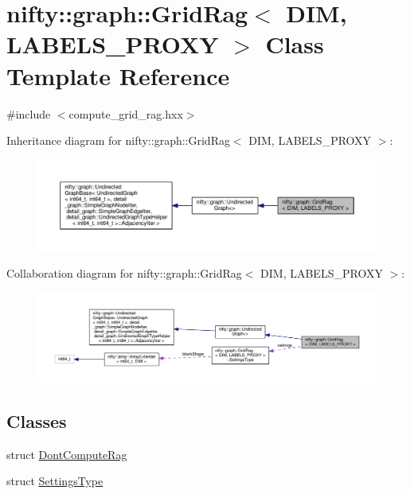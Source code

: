 \hypertarget{classnifty_1_1graph_1_1GridRag}{}\section{nifty\+:\+:graph\+:\+:Grid\+Rag$<$ D\+I\+M, L\+A\+B\+E\+L\+S\+\_\+\+P\+R\+O\+X\+Y $>$ Class Template Reference}
\label{classnifty_1_1graph_1_1GridRag}


{\ttfamily \#include $<$compute\+\_\+grid\+\_\+rag.\+hxx$>$}



Inheritance diagram for nifty\+:\+:graph\+:\+:Grid\+Rag$<$ D\+I\+M, L\+A\+B\+E\+L\+S\+\_\+\+P\+R\+O\+X\+Y $>$\+:\nopagebreak
\begin{figure}[H]
\begin{center}
\leavevmode
\includegraphics[width=350pt]{classnifty_1_1graph_1_1GridRag__inherit__graph}
\end{center}
\end{figure}


Collaboration diagram for nifty\+:\+:graph\+:\+:Grid\+Rag$<$ D\+I\+M, L\+A\+B\+E\+L\+S\+\_\+\+P\+R\+O\+X\+Y $>$\+:\nopagebreak
\begin{figure}[H]
\begin{center}
\leavevmode
\includegraphics[width=350pt]{classnifty_1_1graph_1_1GridRag__coll__graph}
\end{center}
\end{figure}
\subsection*{Classes}
\begin{DoxyCompactItemize}
\item 
struct \hyperlink{structnifty_1_1graph_1_1GridRag_1_1DontComputeRag}{Dont\+Compute\+Rag}
\item 
struct \hyperlink{structnifty_1_1graph_1_1GridRag_1_1SettingsType}{Settings\+Type}
\end{DoxyCompactItemize}
